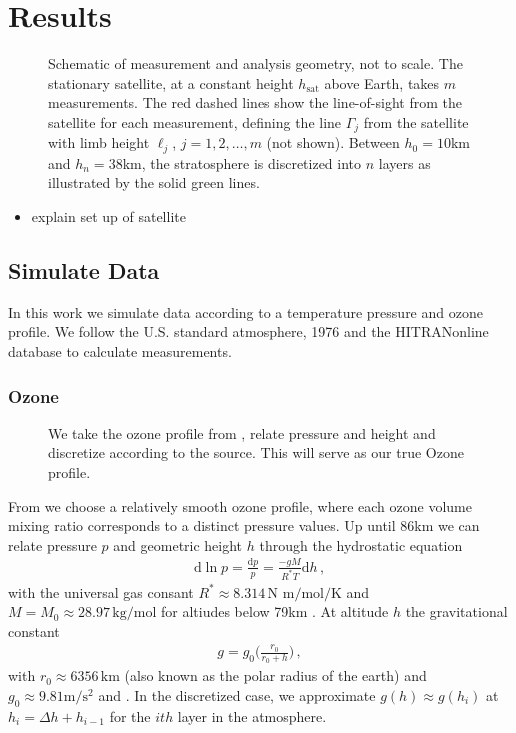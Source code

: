 \chapter{Results}

\begin{figure}[ht!]
	\centering
	\scalebox{1.5}{}
	\label{fig:LIMB}
	\caption{Schematic of measurement and analysis geometry, not to scale.
		The stationary satellite, at a constant height $h_\text{sat}$ above  Earth, takes $m$ measurements.
		The red dashed lines show the line-of-sight from the satellite for each measurement, defining the line $\Gamma_j$ from the satellite with limb height $\ell_j$, $j=1,2,\ldots,m$ (not shown).
		Between $h_0 = 10$km and $h_{n} = 38$km, the stratosphere is discretized into $n$ layers as illustrated by the solid green lines.}
\end{figure}

\begin{itemize}
	\item explain set up of satellite
\end{itemize}

\section{Simulate Data}
In this work we simulate data according to a temperature pressure and ozone profile.
We follow the U.S. standard atmosphere, 1976 \cite{} and the HITRANonline \cite{} database to calculate measurements.


\subsection{Ozone}
\begin{figure}[ht!]
	\centering
	\caption{We take the ozone profile from \cite{}, relate pressure and height and discretize according to the source.
		This will serve as our true Ozone profile.}
	\label{fig:nter-label}
\end{figure}
From \cite{} we choose a relatively smooth ozone profile, where each ozone volume mixing ratio corresponds to a distinct pressure values.
Up until $86$km we can relate pressure $p$ and geometric height $h$ through the hydrostatic equation
\begin{align}
	\text{d} \ln p= \frac{\text{d}p}{p} = \frac{- g M}{R^* T} \text{d} h \, ,
\end{align}
with the universal gas consant $R^* \approx 8.314  \, \text{N m} / \text{mol} / \text{K}$ and $M = M_0 \approx 28.97 \, \text{kg}/\text{mol}$ for altiudes below 79km \cite{}.
At altitude $h$ the gravitational constant
\begin{align}
	g = g_0 \Bigg( \frac{r_0}{r_0 + h} \Bigg) \, ,
\end{align}
with $r_0 \approx 6356 \, \text{km}$ (also known as the polar radius of the earth) and $g_0 \approx 9.81 \text{m}/\text{s}^2$ and \cite{}.
In the discretized case, we approximate $g(h) \approx g(h_i) $ at $h_i = \Delta h + h_{i-1}$ for the $ith$ layer in the atmosphere.

